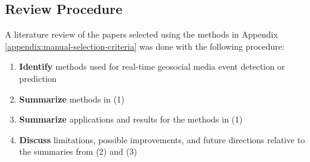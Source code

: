 \begin{appendices}
\subsection{Review Procedure} \label{appendix:review-procedure}

A literature review of the papers selected using the methods in Appendix \ref{appendix:manual-selection-criteria} was done with the following procedure:

\begin{enumerate}
	\item \textbf{Identify} methods used for real-time geosocial media event detection or prediction
	\item \textbf{Summarize} methods in (1)
	\item \textbf{Summarize} applications and results for the methods in (1)
	\item \textbf{Discuss} limitations, possible improvements, and future directions relative to the summaries from (2) and (3)
\end{enumerate}


\end{appendices}

